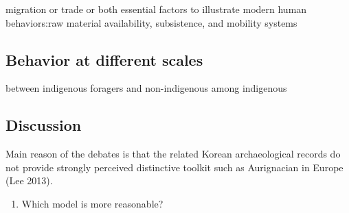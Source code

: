 \documentclass[american,man]{apa6}
\begin{document}
migration or trade or both essential factors to illustrate modern human
behaviors:raw material availability, subsistence, and mobility systems

\subsection{Behavior at different
scales}\label{behavior-at-different-scales}

between indigenous foragers and non-indigenous among indigenous

\subsection{Discussion}\label{discussion}

Main reason of the debates is that the related Korean archaeological
records do not provide strongly perceived distinctive toolkit such as
Aurignacian in Europe (Lee 2013).

\begin{enumerate}
\def\labelenumi{\arabic{enumi})}
\itemsep1pt\parskip0pt
\item
  Which model is more reasonable?
\end{enumerate}
\end{document}
